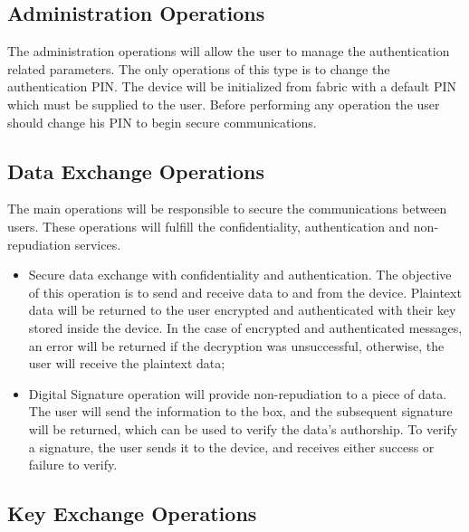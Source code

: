 \subsection{Administration Operations}\label{chap:arch:ops:administration}

The administration operations will allow the user to manage the authentication related parameters.
The only operations of this type is to change the authentication \ac{PIN}. The device will be initialized from fabric with a default \ac{PIN} which must be supplied to the user. Before performing any operation the user should change his PIN to begin secure communications.

\subsection{Data Exchange Operations}\label{chap:arch:ops:data}

The main operations will be responsible to secure the communications between users. These operations will fulfill the confidentiality, authentication and non-repudiation services.

\begin{itemize}
    \item Secure data exchange with confidentiality and authentication. The objective of this operation is to send and receive data to and from the device. Plaintext data will be returned to the user encrypted and authenticated with their key stored inside the device. In the case of encrypted and authenticated messages, an error will be returned if the decryption was unsuccessful, otherwise, the user will receive the plaintext data;
    \item Digital Signature operation will provide non-repudiation to a piece of data. The user will send the information to the box, and the subsequent signature will be returned, which can be used to verify the data's authorship. To verify a signature, the user sends it to the device, and receives either success or failure to verify.
\end{itemize}

\subsection{Key Exchange Operations}\label{chap:arch:ops:key}

